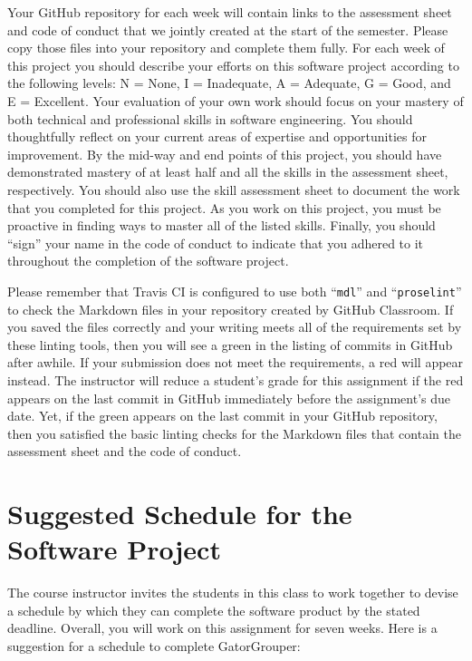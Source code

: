 \documentclass[11pt]{article}
\newcommand{\command}[1]{``\lstinline{#1}''}
\newcommand{\checkmark}{\ding{51}}
\newcommand{\naughtmark}{\ding{55}}
\begin{document}
Your GitHub repository for each week will contain links to the assessment sheet
and code of conduct that we jointly created at the start of the semester. Please
copy those files into your repository and complete them fully. For each week of
this project you should describe your efforts on this software project according
to the following levels: N = None, I = Inadequate, A = Adequate, G = Good, and E
= Excellent. Your evaluation of your own work should focus on your mastery of
both technical and professional skills in software engineering. You should
thoughtfully reflect on your current areas of expertise and opportunities for
improvement. By the mid-way and end points of this project, you should have
demonstrated mastery of at least half and all the skills in the assessment
sheet, respectively. You should also use the skill assessment sheet to document
the work that you completed for this project. As you work on this project, you
must be proactive in finding ways to master all of the listed skills. Finally,
you should ``sign'' your name in the code of conduct to indicate that you
adhered to it throughout the completion of the software project.


Please remember that Travis CI is configured to use both \command{mdl} and
\command{proselint} to check the Markdown files in your repository created by
GitHub Classroom.
%
If you saved the files correctly and your writing meets all of the requirements
set by these linting tools, then you will see a green \checkmark{} in the
listing of commits in GitHub after awhile. If your submission does not meet the
requirements, a red \naughtmark{} will appear instead. The instructor will
reduce a student's grade for this assignment if the red \naughtmark{} appears on
the last commit in GitHub immediately before the assignment's due date. Yet, if
the green \checkmark{} appears on the last commit in your GitHub repository,
then you satisfied the basic linting checks for the Markdown files that contain
the assessment sheet and the code of conduct.

\section*{Suggested Schedule for the Software Project}

The course instructor invites the students in this class to work together to
devise a schedule by which they can complete the software product by the stated
deadline. Overall, you will work on this assignment for seven weeks. Here is a
suggestion for a schedule to complete GatorGrouper:
\end{document}
